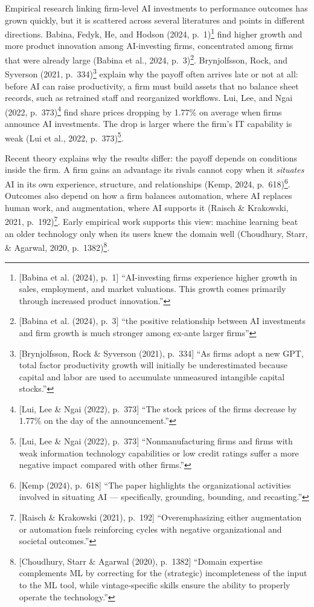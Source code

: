 \documentclass[12pt, a4paper]{article}
\begin{document}
Empirical research linking firm-level AI investments to performance outcomes
has grown quickly, but it is scattered across several literatures and points
in different directions. Babina, Fedyk, He, and
Hodson (2024, p.~1)\footnote{[Babina et al. (2024), p.~1] ``AI-investing firms experience higher growth in sales, employment, and market valuations. This growth comes primarily through increased product innovation.''} find higher growth and more product innovation among
AI-investing firms, concentrated among firms that were already large (Babina
et al., 2024, p.~3)\footnote{[Babina et al. (2024), p.~3] ``the positive relationship between AI investments and firm growth is much stronger among ex-ante larger firms''}. Brynjolfsson, Rock, and Syverson (2021, p.~334)\footnote{[Brynjolfsson, Rock \& Syverson (2021), p.~334] ``As firms adopt a new GPT, total factor productivity growth will initially be underestimated because capital and labor are used to accumulate unmeasured intangible capital stocks.''}
explain why the payoff often arrives late or not at all: before AI can raise
productivity, a firm must build assets that no balance sheet records, such as
retrained staff and reorganized workflows. Lui, Lee, and Ngai (2022, p.~373)\footnote{[Lui, Lee \& Ngai (2022), p.~373] ``The stock prices of the firms decrease by 1.77\% on the day of the announcement.''}
find share prices dropping by 1.77\% on average when firms announce AI
investments. The drop is larger where the firm's IT capability is weak (Lui
et al., 2022, p.~373)\footnote{[Lui, Lee \& Ngai (2022), p.~373] ``Nonmanufacturing firms and firms with weak information technology capabilities or low credit ratings suffer a more negative impact compared with other firms.''}.

Recent theory explains why the results differ: the payoff depends on
conditions inside the firm. A firm gains an advantage its rivals cannot copy
when it \emph{situates} AI in its own experience, structure, and
relationships (Kemp,
2024, p.~618)\footnote{[Kemp (2024), p.~618] ``The paper highlights the organizational activities involved in situating AI --- specifically, grounding, bounding, and recasting.''}. Outcomes also
depend on how a firm balances automation, where AI replaces human work, and
augmentation, where AI supports it (Raisch
\& Krakowski, 2021, p.~192)\footnote{[Raisch \& Krakowski (2021), p.~192] ``Overemphasizing either augmentation or automation fuels reinforcing cycles with negative organizational and societal outcomes.''}. Early empirical work supports this view:
machine learning beat an older technology only when its users knew the domain
well (Choudhury, Starr, \& Agarwal, 2020, p.~1382)\footnote{[Choudhury, Starr \& Agarwal (2020), p.~1382] ``Domain expertise complements ML by correcting for the (strategic) incompleteness of the input to the ML tool, while vintage-specific skills ensure the ability to properly operate the technology.''}.
\end{document}
